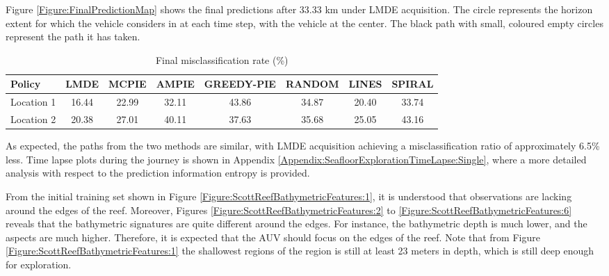 			Figure \ref{Figure:FinalPredictionMap} shows the final predictions after 33.33 km under LMDE acquisition. The circle represents the horizon extent for which the vehicle considers in at each time step, with the vehicle at the center. The black path with small, coloured empty circles represent the path it has taken. 
					
			\begin{table}[t]
				{\footnotesize
				\begin{center}
					\begin{tabular}{ l c c c c c c c }
					\hline
					Policy & LMDE & MCPIE & AMPIE & GREEDY-PIE & RANDOM & LINES & SPIRAL \\
					\hline
					Location 1 & 16.44 & 22.99 & 32.11 & 43.86 & 34.87 & 20.40 & 33.74 \\
					Location 2 & 20.38 & 27.01 & 40.11 & 37.63 & 35.68 & 25.05 & 43.16 \\
					\hline
					\end{tabular}
				\end{center}
				}
		  	\caption{Final misclassification rate (\%)}
		  	\label{Table:CompareMethods}			
		  	\end{table}	
	  	
			As expected, the paths from the two methods are similar, with LMDE acquisition achieving a misclassification ratio of approximately 6.5\% less. Time lapse plots during the journey is shown in Appendix \ref{Appendix:SeafloorExplorationTimeLapse:Single}, where a more detailed analysis with respect to the prediction information entropy is provided.
			
			From the initial training set shown in Figure \ref{Figure:ScottReefBathymetricFeatures:1}, it is understood that observations are lacking around the edges of the reef. Moreover, Figures \ref{Figure:ScottReefBathymetricFeatures:2} to \ref{Figure:ScottReefBathymetricFeatures:6} reveals that the bathymetric signatures are quite different around the edges. For instance, the bathymetric depth is much lower, and the aspects are much higher. Therefore, it is expected that the AUV should focus on the edges of the reef. Note that from Figure \ref{Figure:ScottReefBathymetricFeatures:1} the shallowest regions of the region is still at least 23 meters in depth, which is still deep enough for exploration.
		
